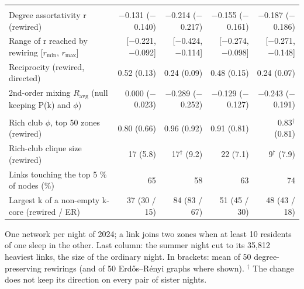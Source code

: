 \begin{table}[!h]
{\begin{tabular}{lrrrr}
\addlinespace
\multicolumn{5}{l}{\textit{Mixing}} \\
\quad Degree assortativity r (rewired) & $-$0.131 ($-$0.140) & $-$0.214 ($-$0.217) & $-$0.155 ($-$0.161) & $-$0.187 ($-$0.186) \\
\quad Range of r reached by rewiring [$r_{\min}$, $r_{\max}$] & [$-$0.221, $-$0.092] & [$-$0.424, $-$0.114] & [$-$0.274, $-$0.098] & [$-$0.271, $-$0.148] \\
\quad Reciprocity (rewired, directed) & 0.52 (0.13) & 0.24 (0.09) & 0.48 (0.15) & 0.24 (0.07) \\
\quad 2nd-order mixing $R_{\mathrm{avg}}$ (null keeping P(k) and $\phi$) & 0.000 ($-$0.023) & $-$0.289 ($-$0.252) & $-$0.129 ($-$0.127) & $-$0.243 ($-$0.191) \\
\addlinespace
\multicolumn{5}{l}{\textit{Rich club and core}} \\
\quad Rich club $\phi$, top 50 zones (rewired) & 0.80 (0.66) & 0.96 (0.92) & 0.91 (0.81) & 0.83$^\dagger$ (0.81) \\
\quad Rich-club clique size (rewired) & 17 (5.8) & 17$^\dagger$ (9.2) & 22 (7.1) & 9$^\dagger$ (7.9) \\
\quad Links touching the top 5 \% of nodes (\%) & 65 & 58 & 63 & 74 \\
\quad Largest k of a non-empty k-core (rewired / ER) & 37 (30 / 15) & 84 (83 / 67) & 51 (45 / 30) & 48 (43 / 18) \\
\bottomrule
\end{tabular}}
\par\smallskip
\begin{minipage}{\linewidth}\footnotesize
One network per night of 2024; a link joins two zones when at least 10 residents of one sleep in the other. Last column: the summer night cut to its 35,812 heaviest links, the size of the ordinary night. In brackets: mean of 50 degree-preserving rewirings (and of 50 Erdős–Rényi graphs where shown). $^\dagger$ The change does not keep its direction on every pair of sister nights.
\end{minipage}
\end{table}
